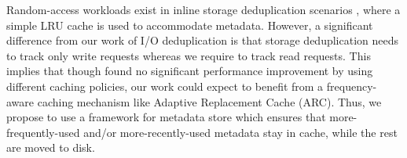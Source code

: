 Random-access workloads exist in inline storage deduplication scenarios
\cite{idedup}, where a simple LRU cache is used to accommodate metadata.
However, a significant difference from our work
of I/O deduplication is that storage deduplication needs to track only
write requests whereas we require to track read requests.
This implies that though \cite{idedup} found no significant performance
improvement by using different caching policies, our work
could expect to benefit from a frequency-aware caching mechanism like
Adaptive Replacement Cache (ARC).
Thus, we propose to use a framework for metadata store which
ensures that more-frequently-used and/or more-recently-used
metadata stay in cache, while the rest are moved to disk.


